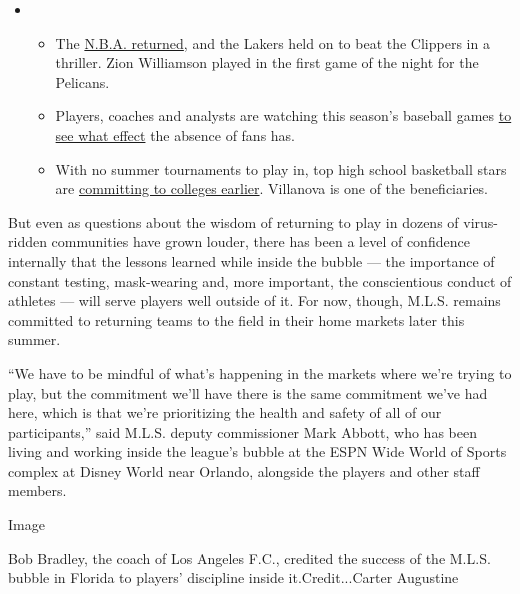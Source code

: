 \begin{itemize}
\item
  \begin{itemize}
  \tightlist
  \item
    The
    \href{https://www.nytimes.com/2020/07/30/sports/basketball/clippers-lakers.html?action=click\&pgtype=Article\&state=default\&region=MAIN_CONTENT_2\&context=storylines_keepup}{N.B.A.
    returned}, and the Lakers held on to beat the Clippers in a
    thriller. Zion Williamson played in the first game of the night for
    the Pelicans.
  \item
    Players, coaches and analysts are watching this season's baseball
    games
    \href{https://www.nytimes.com/2020/07/31/sports/baseball/baseball-empty-stadiums-effects.html?action=click\&pgtype=Article\&state=default\&region=MAIN_CONTENT_2\&context=storylines_keepup}{to
    see what effect} the absence of fans has.
  \item
    With no summer tournaments to play in, top high school basketball
    stars are
    \href{https://www.nytimes.com/2020/07/30/sports/ncaabasketball/college-basketball-recruiting.html?action=click\&pgtype=Article\&state=default\&region=MAIN_CONTENT_2\&context=storylines_keepup}{committing
    to colleges earlier}. Villanova is one of the beneficiaries.
  \end{itemize}
\end{itemize}

But even as questions about the wisdom of returning to play in dozens of
virus-ridden communities have grown louder, there has been a level of
confidence internally that the lessons learned while inside the bubble
--- the importance of constant testing, mask-wearing and, more
important, the conscientious conduct of athletes --- will serve players
well outside of it. For now, though, M.L.S. remains committed to
returning teams to the field in their home markets later this summer.

``We have to be mindful of what's happening in the markets where we're
trying to play, but the commitment we'll have there is the same
commitment we've had here, which is that we're prioritizing the health
and safety of all of our participants,'' said M.L.S. deputy commissioner
Mark Abbott, who has been living and working inside the league's bubble
at the ESPN Wide World of Sports complex at Disney World near Orlando,
alongside the players and other staff members.

Image

Bob Bradley, the coach of Los Angeles F.C., credited the success of the
M.L.S. bubble in Florida to players' discipline inside
it.Credit...Carter Augustine

